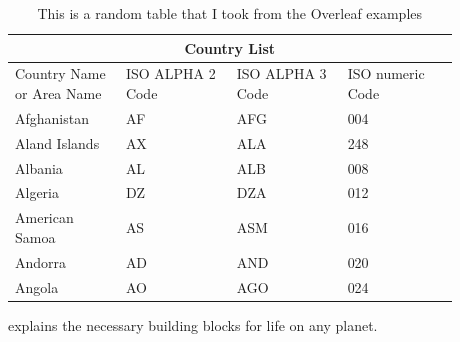 \lipsum[3]

\begin{table}
\centering
\begin{tabular}{ |p{0.22\linewidth}||p{0.22\linewidth}|p{0.22\linewidth}|p{0.22\linewidth}|  }
 \hline
 \multicolumn{4}{|c|}{Country List} \\
 \hline
 Country Name or Area Name& ISO ALPHA 2 Code &ISO ALPHA 3 Code&ISO numeric Code\\
 \hline
 Afghanistan   & AF    &AFG&   004\\
 Aland Islands&   AX  & ALA   &248\\
 Albania &AL & ALB&  008\\
 Algeria    &DZ & DZA&  012\\
 American Samoa&   AS  & ASM&016\\
 Andorra& AD  & AND   &020\\
 Angola& AO  & AGO&024\\
 \hline
\end{tabular}
\caption{This is a random table that I took from the Overleaf examples}
\end{table}

\lipsum[4]


\cite{Langmuir} explains the necessary building blocks for life on any planet.

